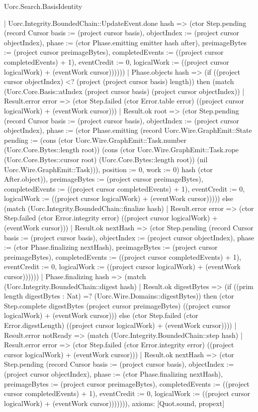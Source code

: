 \begin{lexlean}{Uorc.Search.BasisIdentity}
\begin{semanticmodule}
{        | Uorc.Integrity.BoundedChain::UpdateEvent.done hash => (ctor Step.pending (record Cursor {basis := (project cursor basis), objectIndex := (project cursor objectIndex), phase := (ctor Phase.emitting emitter hash after), preimageBytes := (project cursor preimageBytes), completedEvents := ((project cursor completedEvents) + 1), eventCredit := 0, logicalWork := ((project cursor logicalWork) + (eventWork cursor))}))))
    | Phase.objects hash => (if ((project cursor objectIndex) <? (project (project cursor basis) length)) then (match (Uorc.Core.Basis::atIndex (project cursor basis) (project cursor objectIndex))
      | Result.error error => (ctor Step.failed (ctor Error.table error) ((project cursor logicalWork) + (eventWork cursor)))
      | Result.ok root => (ctor Step.pending (record Cursor {basis := (project cursor basis), objectIndex := (project cursor objectIndex), phase := (ctor Phase.emitting (record Uorc.Wire.GraphEmit::State {pending := (cons (ctor Uorc.Wire.GraphEmit::Task.number (Uorc.Core.Bytes::length root)) (cons (ctor Uorc.Wire.GraphEmit::Task.rope (Uorc.Core.Bytes::cursor root) (Uorc.Core.Bytes::length root)) (nil Uorc.Wire.GraphEmit::Task))), position := 0, work := 0}) hash (ctor After.object)), preimageBytes := (project cursor preimageBytes), completedEvents := ((project cursor completedEvents) + 1), eventCredit := 0, logicalWork := ((project cursor logicalWork) + (eventWork cursor))}))) else (match (Uorc.Integrity.BoundedChain::finalize hash)
      | Result.error error => (ctor Step.failed (ctor Error.integrity error) ((project cursor logicalWork) + (eventWork cursor)))
      | Result.ok nextHash => (ctor Step.pending (record Cursor {basis := (project cursor basis), objectIndex := (project cursor objectIndex), phase := (ctor Phase.finalizing nextHash), preimageBytes := (project cursor preimageBytes), completedEvents := ((project cursor completedEvents) + 1), eventCredit := 0, logicalWork := ((project cursor logicalWork) + (eventWork cursor))}))))
    | Phase.finalizing hash => (match (Uorc.Integrity.BoundedChain::digest hash)
      | Result.ok digestBytes => (if ((prim length digestBytes : Nat) =? (Uorc.Wire.Domains::digestBytes)) then (ctor Step.complete digestBytes (project cursor preimageBytes) ((project cursor logicalWork) + (eventWork cursor))) else (ctor Step.failed (ctor Error.digestLength) ((project cursor logicalWork) + (eventWork cursor))))
      | Result.error notReady => (match (Uorc.Integrity.BoundedChain::step hash)
        | Result.error error => (ctor Step.failed (ctor Error.integrity error) ((project cursor logicalWork) + (eventWork cursor)))
        | Result.ok nextHash => (ctor Step.pending (record Cursor {basis := (project cursor basis), objectIndex := (project cursor objectIndex), phase := (ctor Phase.finalizing nextHash), preimageBytes := (project cursor preimageBytes), completedEvents := ((project cursor completedEvents) + 1), eventCredit := 0, logicalWork := ((project cursor logicalWork) + (eventWork cursor))}))))),
  axioms: [Quot.sound, propext]
}


\end{semanticmodule}
\end{lexlean}
